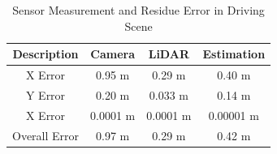 \begin{table}
    \centering
    \begin{tabular}{|c|c|c|c|}
        \hline
        \textbf{Description} & \textbf{Camera} & \textbf{LiDAR} & \textbf{Estimation} \\
        \hline
        X Error & 0.95 m & 0.29 m & 0.40 m\\
        \hline
        Y Error & 0.20 m & 0.033 m & 0.14 m\\
        \hline
        X Error & 0.0001 m & 0.0001 m & 0.00001 m\\
        \hline
        Overall Error & 0.97 m & 0.29 m & 0.42 m\\
        \hline        
    \end{tabular}
    \caption{Sensor Measurement and Residue Error in Driving Scene}
    \label{sensorerrorscene}
\end{table}


